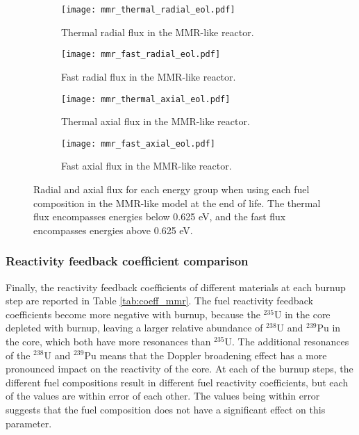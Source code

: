 \begin{figure}[h!]
        \centering
        \begin{subfigure}[b]{0.48\textwidth}
            \centering
            \texttt{[image: mmr\_thermal\_radial\_eol.pdf]}
            \caption{Thermal radial flux in the \gls{MMR}-like reactor.}
            \label{fig:mmr_thermal_radial_eol}
        \end{subfigure}
        \hfill
        \begin{subfigure}[b]{0.48\textwidth}
            \centering
            \texttt{[image: mmr\_fast\_radial\_eol.pdf]}
            \caption{Fast radial flux in the \gls{MMR}-like reactor.}
            \label{fig:mmr_fast_radial_eol}
        \end{subfigure}
        \hfill
            
        \begin{subfigure}[b]{0.48\textwidth}
            \centering
            \texttt{[image: mmr\_thermal\_axial\_eol.pdf]}
            \caption{Thermal axial flux in the \gls{MMR}-like reactor. }
            \label{fig:mmr_thermal_axial_eol}
        \end{subfigure}
        \hfill
        \begin{subfigure}[b]{0.48\textwidth}
            \centering
            \texttt{[image: mmr\_fast\_axial\_eol.pdf]}
            \caption{Fast axial flux in the \gls{MMR}-like reactor.}
            \label{fig:mmr_fast_axial_eol}
        \end{subfigure}
        \hfill
        \caption{Radial and axial flux for each energy group when using 
        each fuel composition in the \gls{MMR}-like model at the end 
        of life. The thermal flux encompasses energies below 
        0.625 eV, and the 
        fast flux encompasses energies above 0.625 eV.}
        \label{fig:mmr_eol}
   \end{figure}


\subsubsection{Reactivity feedback coefficient comparison}
Finally, the reactivity feedback coefficients of different materials 
at each burnup step are reported in Table \ref{tab:coeff_mmr}. The 
fuel reactivity feedback coefficients become more negative with 
burnup, because the $^{235}$U in the core depleted with burnup, 
leaving a larger relative abundance of $^{238}$U and $^{239}$Pu in 
the core, which both have more resonances than $^{235}$U. The 
additional resonances of the $^{238}$U and $^{239}$Pu means that the 
Doppler broadening effect has a more pronounced impact on the reactivity 
of the core. At each of the burnup steps, the different fuel compositions 
result in different fuel reactivity coefficients, but each of the values 
are within error of each other. The values being within error suggests 
that the fuel composition does not have a significant effect on 
this parameter. 

